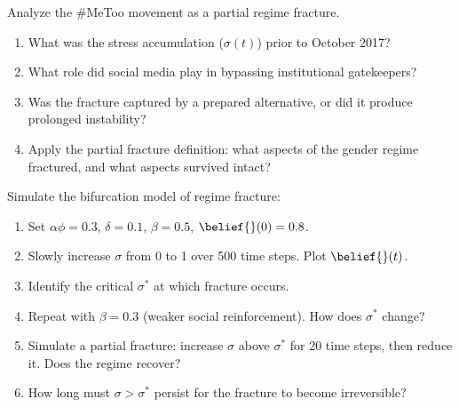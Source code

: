 \begin{exercise}
Analyze the \#MeToo movement as a partial regime fracture.
\begin{enumerate}[nosep]
  \item What was the stress accumulation ($\sigma(t)$) prior to October 2017?
  \item What role did social media play in bypassing institutional gatekeepers?
  \item Was the fracture captured by a prepared alternative, or did it produce prolonged instability?
  \item Apply the partial fracture definition: what aspects of the gender regime fractured, and what aspects survived intact?
\end{enumerate}
\end{exercise}

\begin{exercise}[Computational]
Simulate the bifurcation model of regime fracture:
\begin{enumerate}[nosep]
  \item Set $\alpha\phi = 0.3$, $\delta = 0.1$, $\beta = 0.5$, $\belief{}(0) = 0.8$.
  \item Slowly increase $\sigma$ from 0 to 1 over 500 time steps. Plot $\belief{}(t)$.
  \item Identify the critical $\sigma^*$ at which fracture occurs.
  \item Repeat with $\beta = 0.3$ (weaker social reinforcement). How does $\sigma^*$ change?
  \item Simulate a partial fracture: increase $\sigma$ above $\sigma^*$ for 20 time steps, then reduce it. Does the regime recover?
  \item How long must $\sigma > \sigma^*$ persist for the fracture to become irreversible?
\end{enumerate}
\end{exercise}
